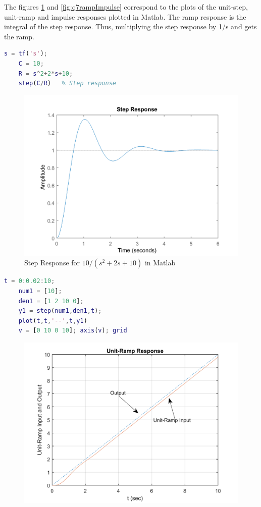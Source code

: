 \documentclass[12pt]{article}
\newenvironment{problem}[2][Problem]{\begin{trivlist}
		\item[\hskip \labelsep {\bfseries #1}\hskip \labelsep {\bfseries #2.}]}{\end{trivlist}}
\begin{document}
\begin{problem}{7 --- B-5-10 --- Matlab plotting} \hfill\newline
The figures \ref{fig:q7step} and \ref{fig:q7rampImpulse} correspond to the plots of the unit-step, unit-ramp and impulse responses plotted in Matlab. The ramp response is the integral of the step response. Thus, multiplying the step response by 1/s and gets the ramp.
\begin{lstlisting}[language = Matlab]
	s = tf('s');
	C = 10;
	R = s^2+2*s+10;
	step(C/R)   % Step response
\end{lstlisting}
\begin{figure}[H]
	\centering
	\includegraphics[width=0.5\linewidth]{Images/Q7Step}
	\caption{Step Response for $10 / (s^2+2s+10)$ in Matlab}
	\label{fig:q7step}
\end{figure}
\begin{lstlisting}[language = Matlab]
	t = 0:0.02:10;
	num1 = [10];
	den1 = [1 2 10 0];
	y1 = step(num1,den1,t);
	plot(t,t,'--',t,y1)
	v = [0 10 0 10]; axis(v); grid
\end{lstlisting}
\begin{figure}[H]
	\centering
	\begin{minipage}{.5\textwidth}
		\centering
	\includegraphics[width=1\linewidth]{Images/Q7RampOgata}

\end{minipage}
\end{figure}
\end{problem}
\end{document}
